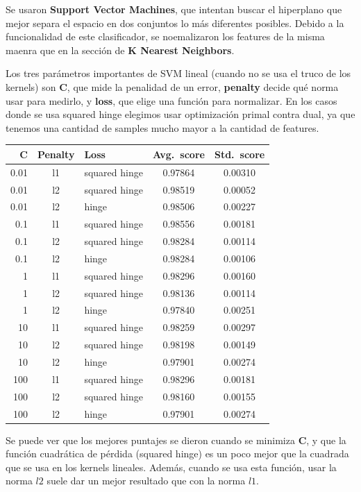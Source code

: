 \documentclass{article}
\begin{document}
Se usaron \textbf{Support Vector Machines}, que intentan buscar el hiperplano que mejor separa el espacio en dos conjuntos lo más diferentes posibles. Debido a la funcionalidad de este clasificador, se noemalizaron los features de la misma maenra que en la sección de \textbf{K Nearest Neighbors}.

Los tres parámetros importantes de SVM lineal (cuando no se usa el truco de los kernels) son \textbf{C}, que mide la penalidad de un error, \textbf{penalty} decide qué norma usar para medirlo, y \textbf{loss}, que elige una función para normalizar. En los casos donde se usa squared hinge elegimos usar optimización primal contra dual, ya que tenemos una cantidad de samples mucho mayor a la cantidad de features\cite{ngcs229}.

\begin{center}
\begin{tabular}{r c l c c}
	\toprule
	\textbf{C} & \textbf{Penalty} & \textbf{Loss} & \textbf{Avg.\ score} & \textbf{Std.\ score} \\
	\midrule
	0.01 & l1 & squared hinge & 0.97864 & 0.00310 \\
	0.01 & l2 & squared hinge & 0.98519 & 0.00052 \\
	0.01 & l2 & hinge & 0.98506 & 0.00227 \\
	0.1 & l1 & squared hinge & 0.98556 & 0.00181 \\
	0.1 & l2 & squared hinge & 0.98284 & 0.00114 \\
	0.1 & l2 & hinge & 0.98284 & 0.00106 \\
	1 & l1 & squared hinge & 0.98296 & 0.00160 \\
	1 & l2 & squared hinge & 0.98136 & 0.00114 \\
	1 & l2 & hinge & 0.97840 & 0.00251 \\
	10 & l1 & squared hinge & 0.98259 & 0.00297 \\
	10 & l2 & squared hinge & 0.98198 & 0.00149 \\
	10 & l2 & hinge & 0.97901 & 0.00274 \\
	100 & l1 & squared hinge & 0.98296 & 0.00181 \\
	100 & l2 & squared hinge & 0.98160 & 0.00155 \\
	100 & l2 & hinge & 0.97901 & 0.00274 \\
	\bottomrule
\end{tabular}
\end{center}

Se puede ver que los mejores puntajes se dieron cuando se minimiza \textbf{C}, y que la función cuadrática de pérdida (squared hinge) es un poco mejor que la cuadrada que se usa en los kernels lineales. Además, cuando se usa esta función, usar la norma \(l2\) suele dar un mejor resultado que con la norma \(l1\).
\end{document}

